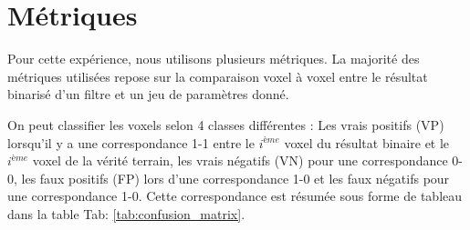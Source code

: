 \begin{table}[ht]
  \begin{center}
\end{center}
\caption{Liste des filtres disponibles dans le banc de test ainsi que leur principale caractéristique.}
\label{tab:diffMethods}
\end{table}

\section{Métriques}

Pour cette expérience, nous utilisons plusieurs métriques. La majorité des métriques utilisées repose sur la comparaison voxel à voxel entre le résultat binarisé d'un filtre et un jeu de paramètres donné.

On peut classifier les voxels selon 4 classes différentes : Les vrais positifs (VP) lorsqu'il y a une correspondance 1-1 entre le $i^{ème}$ voxel du résultat binaire et le $i^{ème}$ voxel de la vérité terrain, les vrais négatifs (VN) pour une correspondance 0-0, les faux positifs (FP) lors d'une correspondance 1-0 et les faux négatifs pour une correspondance 1-0. Cette correspondance est résumée sous forme de tableau dans la table Tab: \ref{tab:confusion_matrix}.

